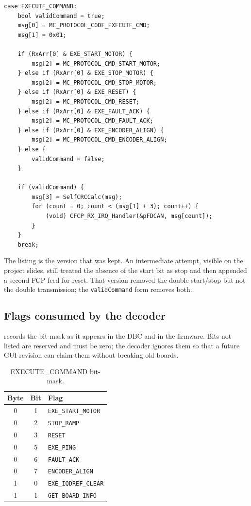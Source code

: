 \begin{lstlisting}[style=cstyle,caption={Decoded EXECUTE\_COMMAND path (simplified).},label=lst:exec]
case EXECUTE_COMMAND:
    bool validCommand = true;
    msg[0] = MC_PROTOCOL_CODE_EXECUTE_CMD;
    msg[1] = 0x01;

    if (RxArr[0] & EXE_START_MOTOR) {
        msg[2] = MC_PROTOCOL_CMD_START_MOTOR;
    } else if (RxArr[0] & EXE_STOP_MOTOR) {
        msg[2] = MC_PROTOCOL_CMD_STOP_MOTOR;
    } else if (RxArr[0] & EXE_RESET) {
        msg[2] = MC_PROTOCOL_CMD_RESET;
    } else if (RxArr[0] & EXE_FAULT_ACK) {
        msg[2] = MC_PROTOCOL_CMD_FAULT_ACK;
    } else if (RxArr[0] & EXE_ENCODER_ALIGN) {
        msg[2] = MC_PROTOCOL_CMD_ENCODER_ALIGN;
    } else {
        validCommand = false;
    }

    if (validCommand) {
        msg[3] = SelfCRCCalc(msg);
        for (count = 0; count < (msg[1] + 3); count++) {
            (void) CFCP_RX_IRQ_Handler(&pFDCAN, msg[count]);
        }
    }
    break;
\end{lstlisting}

The listing is the version that was kept. An intermediate attempt, visible
on the project slides, still treated the absence of the start bit as stop
and then appended a second FCP feed for reset. That version removed the
double start/stop but not the double transmission; the \texttt{validCommand}
form removes both.

\subsection{Flags consumed by the decoder}
 records the bit-mask as it appears in the DBC and in
the firmware. Bits not listed are reserved and must be zero; the decoder
ignores them so that a future GUI revision can claim them without breaking
old boards.

\begin{table}[ht]
\centering
\caption{EXECUTE\_COMMAND bit-mask.}
\label{tab:exec-flags}
\begin{tabular}{ccl}
\toprule
Byte & Bit & Flag \\
\midrule
0 & 1 & \texttt{EXE\_START\_MOTOR} \\
0 & 2 & \texttt{STOP\_RAMP} \\
0 & 3 & \texttt{RESET} \\
0 & 5 & \texttt{EXE\_PING} \\
0 & 6 & \texttt{FAULT\_ACK} \\
0 & 7 & \texttt{ENCODER\_ALIGN} \\
1 & 0 & \texttt{EXE\_IQDREF\_CLEAR} \\
1 & 1 & \texttt{GET\_BOARD\_INFO} \\
\bottomrule
\end{tabular}
\end{table}

